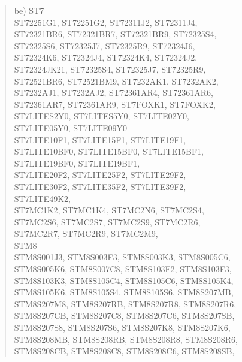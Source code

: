 \documentclass[12pt,a4paper,twoside]{report}
\begin{document}
\begin{quote}
be) ST7 \\
    ST72251G1, ST72251G2, ST72311J2, ST72311J4, \\
    ST72321BR6, ST72321BR7, ST72321BR9, ST72325S4, \\
    ST72325S6, ST72325J7, ST72325R9, ST72324J6, \\
    ST72324K6, ST72324J4, ST72324K4, ST72324J2, \\
    ST72324JK21, ST72325S4, ST72325J7, ST72325R9, \\
    ST72521BR6, ST72521BM9, ST7232AK1, ST7232AK2, \\
    ST7232AJ1, ST7232AJ2, ST72361AR4, ST72361AR6, \\
    ST72361AR7, ST72361AR9, ST7FOXK1, ST7FOXK2, \\
    ST7LITES2Y0, ST7LITES5Y0, ST7LITE02Y0, \\
    ST7LITE05Y0, ST7LITE09Y0 \\
    ST7LITE10F1, ST7LITE15F1, ST7LITE19F1, \\
    ST7LITE10BF0, ST7LITE15BF0, ST7LITE15BF1, \\
    ST7LITE19BF0, ST7LITE19BF1, \\
    ST7LITE20F2, ST7LITE25F2, ST7LITE29F2, \\
    ST7LITE30F2, ST7LITE35F2, ST7LITE39F2, \\
    ST7LITE49K2, \\
    ST7MC1K2, ST7MC1K4, ST7MC2N6, ST7MC2S4, \\
    ST7MC2S6, ST7MC2S7, ST7MC2S9, ST7MC2R6, \\
    ST7MC2R7, ST7MC2R9, ST7MC2M9, \\
    STM8 \\
    STM8S001J3, STM8S003F3, STM8S003K3, STM8S005C6,\\
    STM8S005K6, STM8S007C8, STM8S103F2, STM8S103F3,\\
    STM8S103K3, STM8S105C4, STM8S105C6, STM8S105K4,\\
    STM8S105K6, STM8S105S4, STM8S105S6, STM8S207MB,\\
    STM8S207M8, STM8S207RB, STM8S207R8, STM8S207R6,\\
    STM8S207CB, STM8S207C8, STM8S207C6, STM8S207SB,\\
    STM8S207S8, STM8S207S6, STM8S207K8, STM8S207K6,\\
    STM8S208MB, STM8S208RB, STM8S208R8, STM8S208R6,\\
    STM8S208CB, STM8S208C8, STM8S208C6, STM8S208SB,\\

\end{quote}
\end{document}
